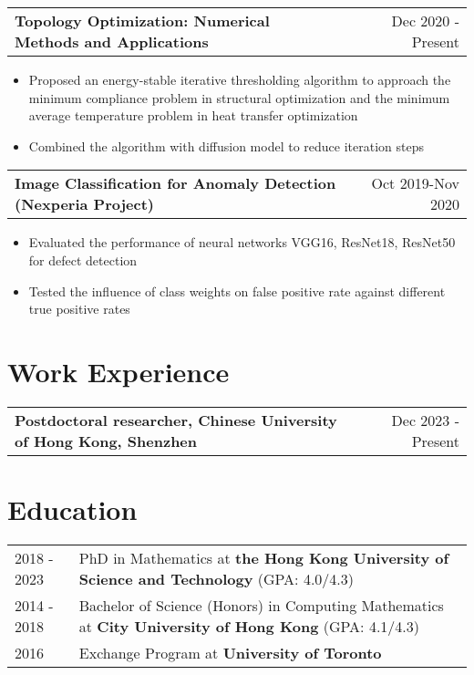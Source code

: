 \documentclass[a4paper,12pt]{article}
\makeatletter
\newenvironment{jobshort}[2]
    {
    \begin{tabularx}{\linewidth}{@{}l X r@{}}
    \textbf{#1} & \hfill &  #2 \\[3.75pt]
    \end{tabularx}
    }
    {
    }
\newenvironment{joblong}[2]
    {
    \begin{tabularx}{\linewidth}{@{}l X r@{}}
    \textbf{#1} & \hfill &  #2 \\[3.75pt]
    \end{tabularx}
    \begin{minipage}[t]{\linewidth}
    \begin{itemize}[nosep,after=\strut, leftmargin=1em, itemsep=3pt,label=--]
    }
    {
    \end{itemize}
    \end{minipage}    
    }
\makeatother
\begin{document}
\begin{joblong}{Topology Optimization: Numerical Methods and Applications} {Dec 2020 - Present}
\item Proposed an energy-stable iterative thresholding algorithm to approach the minimum compliance problem in structural optimization and the minimum average temperature problem in heat transfer optimization
\item Combined the algorithm with diffusion model to reduce iteration steps
\end{joblong}

\begin{joblong}{Image Classification for Anomaly Detection (Nexperia Project)} {Oct 2019-Nov 2020}
    \item Evaluated the performance of neural networks VGG16, ResNet18, ResNet50 for defect detection
    \item Tested the influence of class weights on false positive rate against different true positive rates
\end{joblong}
  
\section{Work Experience}
\begin{jobshort}{Postdoctoral researcher, Chinese University of Hong Kong, Shenzhen}{Dec 2023 - Present}
\end{jobshort}
\section{Education}
\begin{tabularx}{\linewidth}{@{}l X@{}}	
2018 - 2023 & PhD in Mathematics at \textbf{the Hong Kong University of Science and Technology} \hfill \normalsize (GPA: 4.0/4.3) \\

2014 - 2018 & Bachelor of Science (Honors) in Computing Mathematics at \textbf{City University of Hong Kong} \hfill (GPA: 4.1/4.3) \\ 

2016 & Exchange Program at \textbf{University of Toronto}
\end{tabularx}

\end{document}
